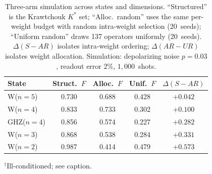 \documentclass[twocolumn,prx,aps,superscriptaddress,longbibliography,floatfix]{revtex4-2}
\begin{document}
\begin{table}[tb]
\centering
\caption{Three-arm simulation across states and dimensions.  ``Structured'' is
the Krawtchouk $K^*$ set; ``Alloc.\ random'' uses the same per-weight
budget with random intra-weight selection (20~seeds); ``Uniform random''
draws 137 operators uniformly (20~seeds).  $\Delta(S{-}AR)$ isolates
intra-weight ordering; $\Delta(AR{-}UR)$ isolates weight allocation.
Simulation: depolarizing noise $p = 0.03$, readout error $2$\%, $1{,}000$~shots.}
\label{tab:weight-alloc}
\begin{tabular}{lcccc}
\toprule
State & Struct.\ $F$ & Alloc.\ $F$ & Unif.\ $F$
  & $\Delta(S{-}AR)$ \\
\midrule
W($n{=}5$)  & 0.730 & 0.688 & 0.428 & $+0.042$ \\
W($n{=}4$)  & 0.833 & 0.733 & 0.302 & $+0.100$ \\
GHZ($n{=}4$) & 0.856 & 0.574 & 0.227 & $+0.282$ \\
W($n{=}3$)  & 0.868 & 0.538 & 0.284 & $+0.331$ \\
W($n{=}2$)  & 0.987 & 0.414 & 0.479 & $+0.573$ \\
\bottomrule
\end{tabular}
\end{table}

\begin{table}[tb]
\centering
\caption{Three-arm \emph{hardware} validation of the weight-allocation
mechanism (Theorem~\ref{thm:spectral-char}(iv)) on \texttt{ibm\_fez}
(4-qubit W~state, three seeds, $1{,}000$~shots per circuit).
Circuit execution order is reversed: weight-allocated random first,
uniform random second, structured last, ruling out
calibration-drift confounds.  The uniform random pool
excludes IIII.  The allocation fraction is
$(F_\mathrm{AR} - F_\mathrm{UR})/(F_{K^*} - F_\mathrm{UR})$.
Uniform random's high volatility ($\sigma = 0.325$,
coefficient of variation ${>}\,1$) makes this ratio unstable;
$\Delta(S{-}AR)$ is the more reliable metric.}
\label{tab:weight-alloc-hw}

{\footnotesize $^\dagger$Ill-conditioned; see caption.}
\end{table}
\end{document}
